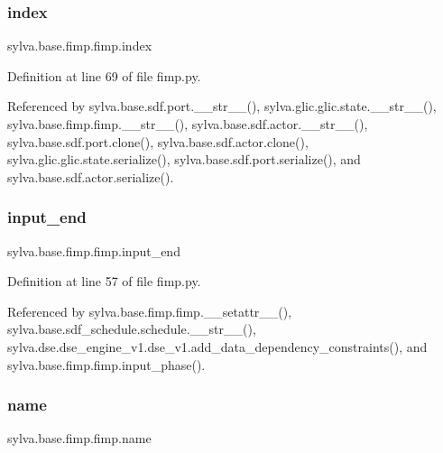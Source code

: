 \subsubsection{\texorpdfstring{index}{index}}
{\footnotesize\ttfamily sylva.\+base.\+fimp.\+fimp.\+index}



Definition at line 69 of file fimp.\+py.



Referenced by sylva.\+base.\+sdf.\+port.\+\_\+\+\_\+str\+\_\+\+\_\+(), sylva.\+glic.\+glic.\+state.\+\_\+\+\_\+str\+\_\+\+\_\+(), sylva.\+base.\+fimp.\+fimp.\+\_\+\+\_\+str\+\_\+\+\_\+(), sylva.\+base.\+sdf.\+actor.\+\_\+\+\_\+str\+\_\+\+\_\+(), sylva.\+base.\+sdf.\+port.\+clone(), sylva.\+base.\+sdf.\+actor.\+clone(), sylva.\+glic.\+glic.\+state.\+serialize(), sylva.\+base.\+sdf.\+port.\+serialize(), and sylva.\+base.\+sdf.\+actor.\+serialize().

\mbox{\label{classsylva_1_1base_1_1fimp_1_1fimp_a892008b42d5b1ba9f52a52d89fc252fa}} 
\subsubsection{\texorpdfstring{input\+\_\+end}{input\_end}}
{\footnotesize\ttfamily sylva.\+base.\+fimp.\+fimp.\+input\+\_\+end}



Definition at line 57 of file fimp.\+py.



Referenced by sylva.\+base.\+fimp.\+fimp.\+\_\+\+\_\+setattr\+\_\+\+\_\+(), sylva.\+base.\+sdf\+\_\+schedule.\+schedule.\+\_\+\+\_\+str\+\_\+\+\_\+(), sylva.\+dse.\+dse\+\_\+engine\+\_\+v1.\+dse\+\_\+v1.\+add\+\_\+data\+\_\+dependency\+\_\+constraints(), and sylva.\+base.\+fimp.\+fimp.\+input\+\_\+phase().

\mbox{\label{classsylva_1_1base_1_1fimp_1_1fimp_a29c118ec372fd4475356ec690b878e32}} 
\subsubsection{\texorpdfstring{name}{name}}
{\footnotesize\ttfamily sylva.\+base.\+fimp.\+fimp.\+name}



